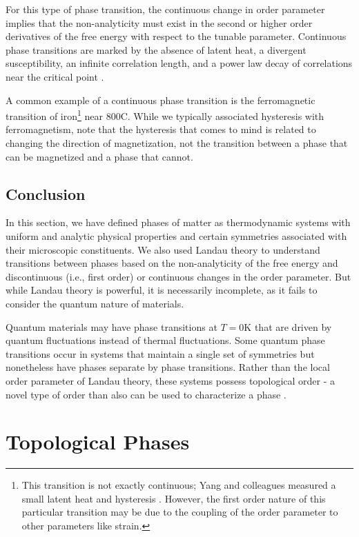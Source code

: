 For this type of phase transition, the continuous change in order parameter implies that the non-analyticity must exist in the second or higher order derivatives of the free energy with respect to the tunable parameter. Continuous phase transitions are marked by the absence of latent heat, a divergent susceptibility, an infinite correlation length, and a power law decay of correlations near the critical point \cite{Cardy1996}.

A common example of a continuous phase transition is the ferromagnetic transition of iron\footnote{This transition is not exactly continuous; Yang and colleagues measured a small latent heat and hysteresis \cite{Yang2008}. However, the first order nature of this particular transition may be due to the coupling of the order parameter to other parameters like strain.} near 800\degree C. While we typically associated hysteresis with ferromagnetism, note that the hysteresis that comes to mind is related to changing the direction of magnetization, not the transition between a phase that can be magnetized and a phase that cannot. 

\subsection{Conclusion}
In this section, we have defined phases of matter as thermodynamic systems with uniform and analytic physical properties and certain symmetries associated with their microscopic constituents. We also used Landau theory to understand transitions between phases based on the non-analyticity of the free energy and discontinuous (i.e., first order) or continuous changes in the order parameter. But while Landau theory is powerful, it is necessarily incomplete, as it fails to consider the quantum nature of materials.

Quantum materials may have phase transitions at $T = 0$K that are driven by quantum fluctuations instead of thermal fluctuations. Some quantum phase transitions occur in systems that maintain a single set of symmetries but nonetheless have phases separate by phase transitions. Rather than the local order parameter of Landau theory, these systems possess topological order - a novel type of order than also can be used to characterize a phase \cite{Wen1990}.

\section{Topological Phases}


